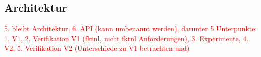 \subsection{Architektur} \label{sec:Architektur}
    
    
    \textcolor{red}{
        5. bleibt Architektur, 6. API (kann umbenannt werden), darunter 5 Unterpunkte: 1. V1, 2. Verifikation V1 (fktnl, nicht fktnl Anforderungen), 3. Experimente, 4. V2, 5. Verifikation V2 (Unterschiede zu V1 betrachten und)
    }
